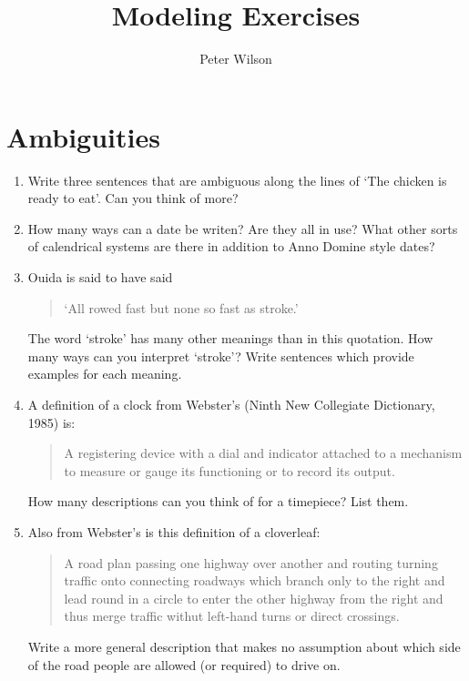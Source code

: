 \documentclass{article}
\title{Modeling Exercises}
\author{Peter Wilson}
\date{}
\newenvironment{exercises}{\begin{enumerate}}{\end{enumerate}}
\begin{document}
\maketitle

\tableofcontents

\clearpage
\section{Ambiguities}

\begin{exercises}

\item Write three sentences that are ambiguous along the lines of
      `The chicken is ready to eat'. Can you think of more?

\item How many ways can a date be writen? Are they all in use? What other
      sorts of calendrical systems are there in addition to Anno Domine style 
      dates?

\item Ouida is said to have said
    \begin{quote} `All rowed fast but none so fast as stroke.' \end{quote}
      The word `stroke' has many other meanings than in this quotation.
      How many ways can you interpret `stroke'? Write sentences which provide
      examples for each meaning.

\item A definition of a clock from Webster's (Ninth New Collegiate 
      Dictionary, 1985) is: \begin{quote} A registering device with
      a dial and indicator attached to a mechanism to measure or gauge
      its functioning or to record its output. \end{quote} 
      How many descriptions can you
      think of for a timepiece? List them.

\item Also from Webster's is this definition of a cloverleaf:
     \begin{quote}
     A road plan passing one highway over another and routing turning
     traffic onto connecting roadways which branch only to the right
     and lead round in a circle to enter the other highway from the 
     right and thus merge traffic withut left-hand turns or direct
     crossings.
     \end{quote}
     Write a more general description that makes no assumption about 
     which side of the road people are allowed (or required) to drive on.

\end{exercises}
\end{document}
